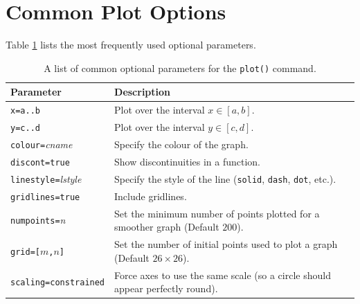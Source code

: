 \section{Common Plot Options}
\label{sec:common_plot_options}

Table \ref{tbl:plot_options} lists the most frequently used optional parameters.

\begin{table}
\label{tbl:plot_options}
\centering
\begin{tabular}{lp{2.5in}}
\hline
Parameter & Description\\
\hline
\texttt{x=a..b}						& Plot over the interval $x\in[a,b]$.
    \index{plot!axes intervals}
    \\
\texttt{y=c..d}						& Plot over the interval $y\in[c,d]$.
    \index{plot!axes intervals}
    \\
\texttt{colour=}\textit{cname}		& Specify the colour of the graph.
    \index{plot!colours}
    \\
\texttt{discont=true}				& Show discontinuities in a function.
    \index{plot!axes intervals}
    \index{plot!discontinuities}
    \\
\texttt{linestyle=}\textit{lstyle}	& Specify the style of the line (\texttt{solid}, \texttt{dash}, \texttt{dot}, etc.).
    \index{plot!line style}
    \\
\texttt{gridlines=true}				& Include gridlines.
    \index{plot!gridlines}
    \\
\texttt{numpoints=}\textit{n}		& Set the minimum number of points plotted for a smoother graph (Default $200$).
    \index{plot!plot resolution}
    \\
\texttt{grid=[$m$,$n$]}				& Set the number of initial points used to plot a graph (Default $26 \times 26$).
    \index{plot!plot resolution}
    \\
\texttt{scaling=constrained}		& Force axes to use the same scale (so a circle should appear perfectly round).
    \index{plot!scaling}
    \\
\hline
\end{tabular}
\caption{A list of common optional parameters for the \texttt{plot()} command.}
\end{table}

